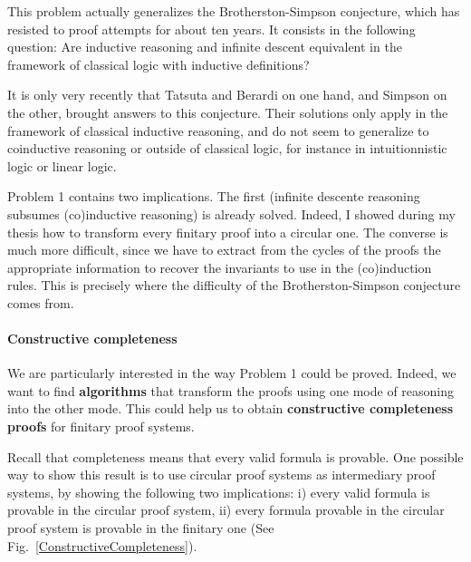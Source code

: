 \documentclass[11pt,twocolumn]{article}
\begin{document}
This problem actually generalizes the Brotherston-Simpson conjecture, which has resisted to proof attempts for about ten years. It consists in the following question: Are inductive reasoning and infinite descent equivalent in the framework of classical logic with inductive definitions?


It is only very recently that Tatsuta and Berardi \cite{BerardiT17fossacs, BerardiT17lics} on one hand, and Simpson \cite{Simpson17fossacs} on the other, brought answers to this conjecture. Their solutions only apply in the framework of classical inductive reasoning, and do not seem to generalize to coinductive reasoning or outside of classical logic, for instance in intuitionnistic logic or linear logic.


\smallskip
Problem 1 contains two implications. The first (infinite descente reasoning subsumes (co)inductive reasoning) is already solved. Indeed, I showed during my thesis how to transform every finitary proof into a circular one. The converse is much more difficult, since we have to extract from the cycles of the proofs the appropriate information to recover the invariants to use in the (co)induction rules. This is precisely where the difficulty of the Brotherston-Simpson conjecture comes from.
  


\paragraph{Constructive completeness}

We are particularly interested in the way Problem 1 could be proved. 
Indeed, we want to find \textbf{algorithms} that transform the proofs using one mode of reasoning into the other mode. This could help us to obtain \textbf{constructive completeness proofs} for finitary proof systems.


Recall that completeness means that every valid formula is provable. One possible way to show this result is to use circular proof systems as intermediary proof systems, by showing the following two implications:
i) every valid formula is provable in the circular proof system, ii) every formula provable in the circular proof system is provable in the finitary one (See Fig.~\ref{ConstructiveCompleteness}).   
 
\end{document}
